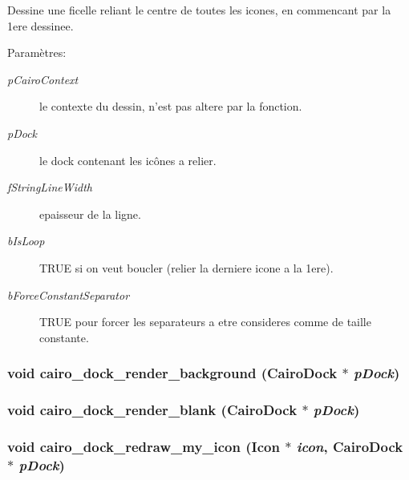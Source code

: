 Dessine une ficelle reliant le centre de toutes les icones, en commencant par la 1ere dessinee. \begin{Desc}
\item[Paramètres:]
\begin{description}
\item[{\em pCairoContext}]le contexte du dessin, n'est pas altere par la fonction. \item[{\em pDock}]le dock contenant les icônes a relier. \item[{\em fStringLineWidth}]epaisseur de la ligne. \item[{\em bIsLoop}]TRUE si on veut boucler (relier la derniere icone a la 1ere). \item[{\em bForceConstantSeparator}]TRUE pour forcer les separateurs a etre consideres comme de taille constante. \end{description}
\end{Desc}
\subsubsection{\setlength{\rightskip}{0pt plus 5cm}void cairo\_\-dock\_\-render\_\-background ({\bf CairoDock} $\ast$ {\em pDock})}\label{cairo-dock-draw_8h_cbf4ddecfb07100464b88c9188351346}


\subsubsection{\setlength{\rightskip}{0pt plus 5cm}void cairo\_\-dock\_\-render\_\-blank ({\bf CairoDock} $\ast$ {\em pDock})}\label{cairo-dock-draw_8h_0082ff87537c9b2dcdfc76eb3a51c76f}


\subsubsection{\setlength{\rightskip}{0pt plus 5cm}void cairo\_\-dock\_\-redraw\_\-my\_\-icon ({\bf Icon} $\ast$ {\em icon}, {\bf CairoDock} $\ast$ {\em pDock})}\label{cairo-dock-draw_8h_cee4212ab3b9a1a4dc5128c825f2e8e4}


